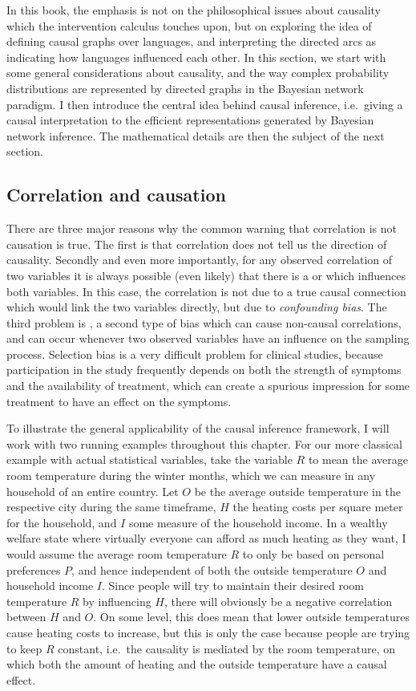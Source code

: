 In this book, the emphasis is not on the philosophical issues about causality which the intervention calculus touches upon, but on exploring the idea of defining causal graphs over languages, and interpreting the directed arcs as indicating how languages influenced each other. In this section, we start with some general considerations about causality, and the way complex probability distributions are represented by directed graphs in the Bayesian network paradigm. I then introduce the central idea behind causal inference, i.e.\ giving a causal interpretation to the efficient representations generated by Bayesian network inference. The mathematical details are then the subject of the next section.

\subsection{Correlation and causation}
There are three major reasons why the common warning that correlation is not causation is true. The first is that correlation does not tell us the direction of causality. Secondly and even more importantly, for any observed correlation of two variables it is always possible (even likely) that there is a \textit{} or \textit{} which influences both variables. In this case, the correlation is not due to a true causal connection which would link the two variables directly, but due to \textit{confounding bias}. The third problem is \textit{}, a second type of bias which can cause non-causal correlations, and can occur whenever two observed variables have an influence on the sampling process. Selection bias is a very difficult problem for clinical studies, because participation in the study frequently depends on both the strength of symptoms and the availability of treatment, which can create a spurious impression for some treatment to have an effect on the symptoms.

To illustrate the general applicability of the causal inference framework, I will work with two running examples throughout this chapter. For our more classical example with actual statistical variables, take the variable $R$ to mean the average room temperature during the winter months, which we can measure in any household of an entire country. Let $O$ be the average outside temperature in the respective city during the same timeframe, $H$ the heating costs per square meter for the household, and $I$ some measure of the household income. In a wealthy welfare state where virtually everyone can afford as much heating as they want, I would assume the average room temperature $R$ to only be based on personal preferences $P$, and hence independent of both the outside temperature $O$ and household income $I$. Since people will try to maintain their desired room temperature $R$ by influencing $H$, there will obviously be a negative correlation between $H$ and $O$. On some level, this does mean that lower outside temperatures cause heating costs to increase, but this is only the case because people are trying to keep $R$ constant, i.e.\ the causality is mediated by the room temperature, on which both the amount of heating and the outside temperature have a causal effect.


